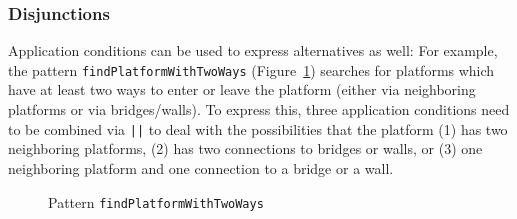 \subsubsection{Disjunctions}
\label{disjunctions}
Application conditions can be used to express alternatives as well:
For example,
the pattern \texttt{findPlatformWithTwoWays} (Figure~\ref{fig:pattern-findPlatformWithTwoWays}) searches for platforms which have at least two ways to enter or leave the platform (either via neighboring platforms or via bridges/walls).
To express this, three application conditions need to be combined via \texttt{||} to deal with the possibilities that the platform 
(1) has two neighboring platforms,
(2) has two connections to bridges or walls,
or (3) one neighboring platform and one connection to a bridge or a wall.

\begin{figure}[h!]
	\centering
	\caption{Pattern \texttt{findPlatformWithTwoWays}}
	\label{fig:pattern-findPlatformWithTwoWays}
\end{figure}


